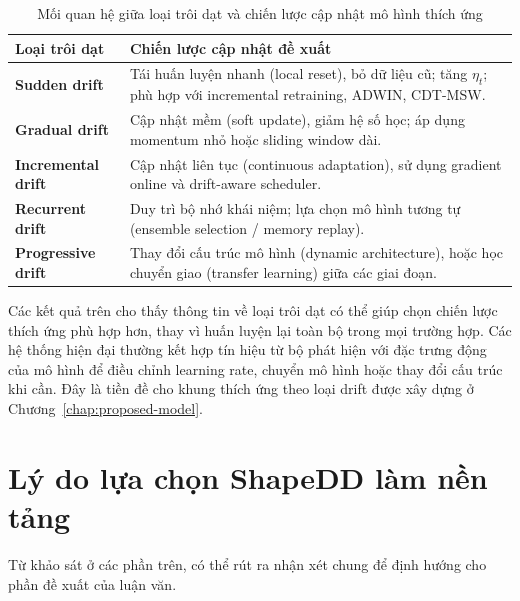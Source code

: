 \begin{table}[H]
	\centering
	\caption{Mối quan hệ giữa loại trôi dạt và chiến lược cập nhật mô hình thích ứng}
	\label{tab:model_update_strategies}
	\begin{tabular}{p{3cm}p{9.5cm}}
		\toprule
		\textbf{Loại trôi dạt}     & \textbf{Chiến lược cập nhật đề xuất}                                                      \\
		\midrule
		\textbf{Sudden drift}      &
		Tái huấn luyện nhanh (local reset), bỏ dữ liệu cũ; tăng $\eta_t$; phù hợp với incremental retraining, ADWIN, CDT-MSW. \\[0.4em]
		\textbf{Gradual drift}     &
		Cập nhật mềm (soft update), giảm hệ số học; áp dụng momentum nhỏ hoặc sliding window dài.                              \\[0.4em]
		\textbf{Incremental drift} &
		Cập nhật liên tục (continuous adaptation), sử dụng gradient online và drift-aware scheduler.                           \\[0.4em]
		\textbf{Recurrent drift}   &
		Duy trì bộ nhớ khái niệm; lựa chọn mô hình tương tự (ensemble selection / memory replay).                              \\[0.4em]
		\textbf{Progressive drift} &
		Thay đổi cấu trúc mô hình (dynamic architecture), hoặc học chuyển giao (transfer learning) giữa các giai đoạn.         \\
		\bottomrule
	\end{tabular}
\end{table}
Các kết quả trên cho thấy thông tin về loại trôi dạt có thể giúp chọn chiến lược thích ứng phù hợp hơn, thay vì huấn luyện lại toàn bộ trong mọi trường hợp. Các hệ thống hiện đại thường kết hợp tín hiệu từ bộ phát hiện với đặc trưng động của mô hình để điều chỉnh learning rate, chuyển mô hình hoặc thay đổi cấu trúc khi cần. Đây là tiền đề cho khung thích ứng theo loại drift được xây dựng ở Chương~\ref{chap:proposed-model}.

\section{Lý do lựa chọn ShapeDD làm nền tảng}
\label{sec:why-shapedd}

Từ khảo sát ở các phần trên, có thể rút ra nhận xét chung để định hướng cho phần đề xuất của luận văn.

